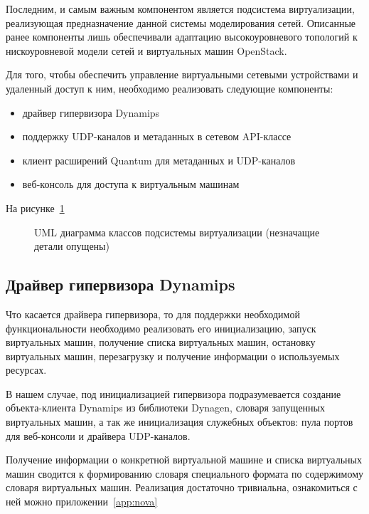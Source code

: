 Последним, и самым важным компонентом является подсистема виртуализации, реализующая
предназначение данной системы моделирования сетей. Описанные ранее компоненты лишь
обеспечивали адаптацию высокоуровневого топологий к нискоуровневой модели 
сетей и виртуальных машин OpenStack. 

Для того, чтобы обеспечить управление виртуальными сетевыми устройствами и удаленный доступ к 
ним, необходимо реализовать следующие компоненты:
\begin{itemize}
    \item драйвер гипервизора Dynamips
    \item поддержку UDP-каналов и метаданных в сетевом API-классе
    \item клиент расширений Quantum для метаданных и UDP-каналов
    \item веб-консоль для доступа к виртуальным машинам    
\end{itemize}
На рисунке~\ref{fig:nova-dynamips-uml}
\begin{figure}
  \centering
  {\footnotesize\tt}
  \caption{UML диаграмма классов подсистемы виртуализации (незначащие детали опущены)}  
  \label{fig:nova-dynamips-uml}
\end{figure}


\subsection{Драйвер гипервизора Dynamips}

Что касается драйвера гипервизора, то для поддержки необходимой функциональности
необходимо реализовать его инициализацию, запуск виртуальных машин, получение списка 
виртуальных машин,
остановку виртуальных машин, перезагрузку и получение информации о используемых
ресурсах.

В нашем случае, под инициализацией гипервизора подразумевается создание объекта-клиента
Dynamips из библиотеки Dynagen, словаря запущенных виртуальных машин, 
а так же инициализация служебных объектов: пула портов для веб-консоли и драйвера UDP-каналов.

Получение информации о конкретной виртуальной машине и списка виртуальных машин сводится
к формированию словаря специального формата по содержимому словаря виртуальных машин. 
Реализация достаточно тривиальна, ознакомиться с ней можно приложении~\ref{app:nova}

